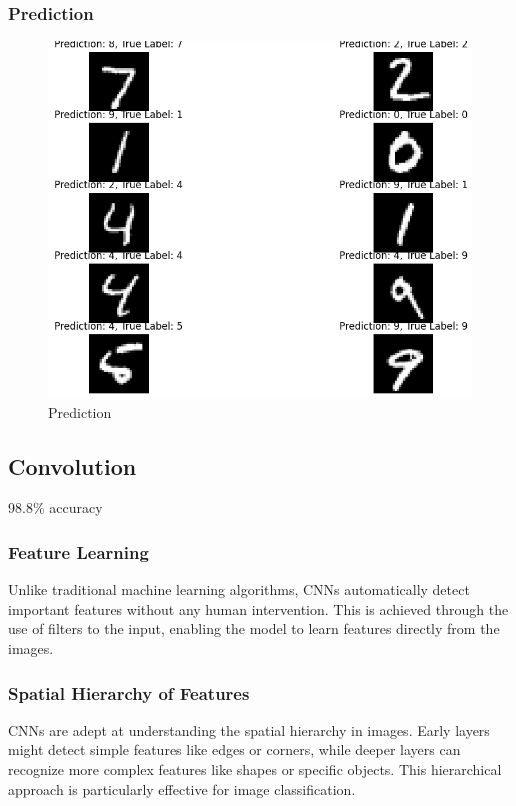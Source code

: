\documentclass{article}
\begin{document}
\subsubsection{Prediction}
\begin{figure}
    \centering
    \includegraphics[width=\textwidth]{media/prediction/4.png}
    \caption{Prediction}
    \label{fig:Prediction}
\end{figure}
\subsection{Convolution}
98.8\% accuracy
\subsubsection{Feature Learning}
Unlike traditional machine learning algorithms,
CNNs automatically detect important features without
 any human intervention. 
 This is achieved through the use of filters to the input, 
 enabling the model to learn features directly 
 from the images.

\subsubsection{Spatial Hierarchy of Features}
CNNs are adept at understanding the spatial hierarchy 
in images. 
Early layers might detect simple features like edges or corners,
 while deeper layers can recognize more complex features 
 like shapes or specific objects. 
This hierarchical approach is particularly effective for
image classification.
\end{document}
